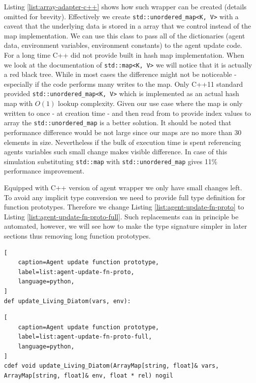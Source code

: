 \documentclass[12pt, a4paper]{report}
\begin{document}
Listing \ref{list:array-adapter-c++} shows how such wrapper can be created
(details omitted for brevity). Effectively we create \lstinline{std::unordered_map<K, V>}
with a caveat that the underlying data is stored in a array that we control
instead of the map implementation. We can use this class to pass all of the
dictionaries (agent data, environment variables, environment constants) to
the agent update code. For a long time C++ did not provide built in hash map
implementation. When we look at the documentation of \lstinline{std::map<K, V>}
we will notice that it is actually a red black tree. While in most cases
the difference might not be noticeable - especially if the code performs
many writes to the map. Only C++11 standard provided \lstinline{std::unordered_map<K, V>}
which is implemented as an actual hash map with $O(1)$ lookup complexity. Given our use case
where the map is only written to once - at creation time - and then
read from to provide index values to array the \lstinline{std::unordered_map} is
a better solution. It should be noted that performance difference would be not large
since our maps are no more than 30 elements in size. Nevertheless if the bulk of
execution time is spent referencing agents variables such small change makes
visible difference. In case of this simulation substituting \lstinline{std::map} with
\lstinline{std::unordered_map} gives 11\% performance improvement.

Equipped with C++ version of agent wrapper we only have small changes left.
To avoid any implicit type conversion we need to provide full type definition
for function prototypes. Therefore we change Listing \ref{list:agent-update-fn-proto}
to Listing \ref{list:agent-update-fn-proto-full}. Such replacements can in principle be
automated, however, we will see how to make the type signature simpler in later sections
thus removing long function prototypes.

\begin{lstlisting}[
    caption=Agent update function prototype,
    label=list:agent-update-fn-proto,
    language=python,
]
def update_Living_Diatom(vars, env):
\end{lstlisting}

\begin{lstlisting}[
    caption=Agent update function prototype,
    label=list:agent-update-fn-proto-full,
    language=python,
]
cdef void update_Living_Diatom(ArrayMap[string, float]& vars, ArrayMap[string, float]& env, float * rel) nogil
\end{lstlisting}
\end{document}

